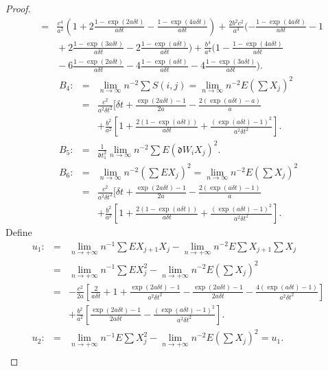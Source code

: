 \documentclass[12pt,reqno, a4paper]{article}
\numberwithin{equation}{section}
\begin{document}
\begin{proof}
 \begin{eqnarray*}
&=&{}\frac {c^4}{a^2}(1+2\frac {1-\exp(2a\delta t)}{a\delta t}-\frac {1-\exp(4a\delta t) }{a\delta t})+\frac {2b^2c^2} {a^3}(-\frac {1-\exp(4a\delta t)}{a\delta t}-1\\&&{}+2\frac {1-\exp(3a\delta t)}{a\delta t}-2\frac {1-\exp(a \delta t)}{a\delta t})+\frac {b^4} {a^4}(1-\frac {1-\exp(4a\delta t)}{a\delta t}\\&&{}-6\frac {1-\exp(2a\delta t)}{a\delta t}-4\frac {1-\exp(a\delta t)}{a\delta t}-4\frac {1-\exp(3a\delta t)}{a\delta t}).\end{eqnarray*}
 \begin{eqnarray*}
B_4:&=&\lim_{n\to \infty} n^{-2}\sum S(i,j)=\lim_{n\to \infty}n^{-2}E(\sum X_{j})^2\\&=&
\frac {c^2}{a^2\delta t^2}[\delta t+\frac {\exp(2a\delta t)-1}{2a }-\frac {2(\exp(a\delta t)-a)} {a}\\&&+\frac {b^2}{a^2}[1+\frac {2(1-\exp(a\delta t))} {a\delta t}
+\frac{(\exp(a\delta t)-1)^2}{a^2 \delta t^2}].\\
    B_5:&=&\frac 1 {\mathfrak{d} t_1^2}\lim_{n\to \infty} n^{-2}\sum E(\mathfrak{d} W_iX_j)^2.\\
                B_6: &=&\lim_{n\to \infty} n^{-2}(\sum EX_j)^2=\lim_{n\to \infty}n^{-2}E(\sum X_{j})^2\\&=&\frac {c^2}{a^2\delta t^2}[\delta t+\frac {\exp(2a\delta t)-1}{2a }-\frac {2(\exp(a\delta t)-1)} {a}\\&&+\frac {b^2}{a^2}[1+\frac {2(1-\exp(a\delta t))} {a\delta t}
+\frac{(\exp(a\delta t)-1)^2}{a^2 \delta t^2}].
\end{eqnarray*}
Define  \begin{eqnarray*}
 u_1:&=&\lim_{n\to+\infty}n^{-1}\sum E X_{j+1}X_j-\lim_{n\to+\infty}n^{-2}E\sum X_{j+1} \sum X_j\\&=&\lim_{n\to+\infty}n^{-1}\sum E X_{j}^2-\lim_{n\to+\infty}n^{-2}E(\sum X_j)^2\\
&=&-\frac {c^2}{2a}[\frac 2 {a\delta t}+1+\frac {\exp(2a \delta t)-1}{a^2\delta t^2}-\frac {\exp(2a \delta t)-1}{2a \delta t}-\frac{4(\exp(a \delta t)-1)}{a^2\delta t^2}]\\&&+\frac {b^2}{a^2}[\frac{\exp(2a \delta t)-1}{2a \delta t}-\frac{(\exp(a \delta t)-1)^2}{a^2 \delta t^2}].\\
u_2:&=&\lim_{n\to+\infty}n^{-1}E\sum X_j^2-\lim_{n\to+\infty}n^{-2}E(\sum X_j)^2=u_1.\\
\end{eqnarray*}


\end{proof}
\end{document}
